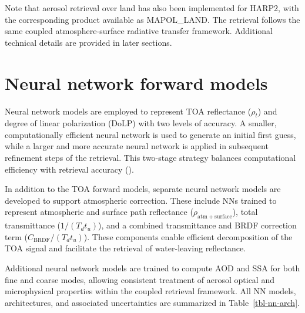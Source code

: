 \documentclass[
  11pt,
  letterpaper,
]{scrreprt}
\begin{document}
Note that aerosol retrieval over land has also been implemented for
HARP2, with the corresponding product available as MAPOL\_LAND. The
retrieval follows the same coupled atmosphere-surface radiative transfer
framework. Additional technical details are provided in later sections.

\section{Neural network forward
models}\label{neural-network-forward-models}

Neural network models are employed to represent TOA reflectance
(\(\rho_t\)) and degree of linear polarization (DoLP) with two levels of
accuracy. A smaller, computationally efficient neural network is used to
generate an initial first guess, while a larger and more accurate neural
network is applied in subsequent refinement steps of the retrieval. This
two-stage strategy balances computational efficiency with retrieval
accuracy ().

In addition to the TOA forward models, separate neural network models
are developed to support atmospheric correction. These include NNs
trained to represent atmospheric and surface path reflectance
(\(\rho_{\mathrm{atm+surface}}\)), total transmittance
(\(1/(T_d t_u)\)), and a combined transmittance and BRDF correction term
(\(C_{\mathrm{BRDF}}/(T_d t_u)\)). These components enable efficient
decomposition of the TOA signal and facilitate the retrieval of
water-leaving reflectance.

Additional neural network models are trained to compute AOD and SSA for
both fine and coarse modes, allowing consistent treatment of aerosol
optical and microphysical properties within the coupled retrieval
framework. All NN models, architectures, and associated uncertainties
are summarized in Table~\ref{tbl-nn-arch}.
\end{document}
